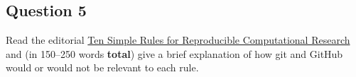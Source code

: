 \documentclass[11pt,onecolumn]{scrartcl}
\begin{document}
\subsection{Question 5}
\label{sec:org5e3ef8f}

Read the editorial \href{https://doi.org/10.1371/journal.pcbi.1003285}{Ten Simple Rules for Reproducible Computational Research} and
(in 150--250 words \textbf{total}) give a brief explanation of how git and GitHub would
or would not be relevant to each rule.
\end{document}
